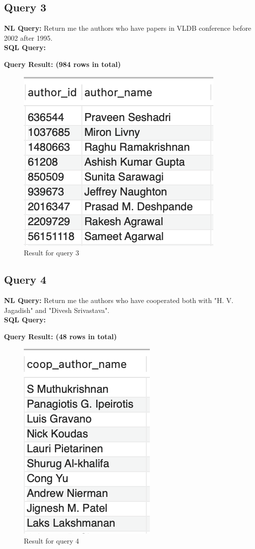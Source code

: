 \documentclass{article}
\begin{document}
\subsection{Query 3}
\textbf{NL Query:} Return me the authors who have papers in VLDB conference before 2002 after 1995.
\vspace{6 pt}
\\
\textbf{SQL Query: }

\textbf{Query Result: (984 rows in total)}
\begin{figure}[h]
	\centering
	\includegraphics[width=.2\textheight]{figures/q3_res.png}
	\caption{Result for query 3}
	\label{fig:004}
\end{figure}
\subsection{Query 4}
\textbf{NL Query:} Return me the authors who have cooperated both with "H. V. Jagadish" and "Divesh Srivastava".
\vspace{6 pt}
\\
\textbf{SQL Query: }

\textbf{Query Result: (48 rows in total)}
\begin{figure}[h]
	\centering
	\includegraphics[width=.15\textheight]{figures/q4_res.png}
	\caption{Result for query 4}
	\label{fig:005}
\end{figure}
\end{document}
